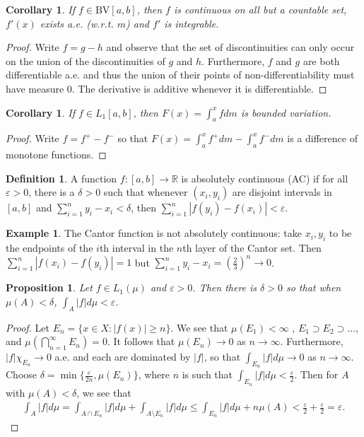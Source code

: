\documentclass[11pt]{amsart}
\newtheorem{proposition}[theorem]{Proposition}
\newtheorem{corollary}[theorem]{Corollary}
\theoremstyle{definition}
\newtheorem{definition}[theorem]{Definition}
\newtheorem{example}[theorem]{Example}
\numberwithin{equation}{section}
\begin{document}
\begin{corollary}
    If $f\in \mathrm{BV}[a,b]$, then $f$ is continuous on all but a countable set, $f'(x)$ exists a.e. (w.r.t. $m$) and $f'$ is integrable.
\end{corollary}
\begin{proof}
    Write $f=g-h$ and observe that the set of discontinuities can only occur on the union of the discontinuities of $g$ and $h$. Furthermore, $f$ and $g$ are both differentiable a.e. and thus the union of their points of non-differentiability must have measure 0. The derivative is additive whenever it is differentiable.
\end{proof}
\begin{corollary}
    If $f\in L_1[a,b]$, then $F(x)=\int_a^xfdm$ is bounded variation.
\end{corollary}
\begin{proof}
    Write $f=f^+-f^-$ so that $F(x)=\int_a^xf^+dm-\int_a^xf^-dm$ is a difference of monotone functions.
\end{proof}
\begin{definition}
    A function $f:[a,b]\to\mathbb R$ is absolutely continuous (AC) if for all $\varepsilon>0$, there is a $\delta>0$ such that whenever $(x_i,y_i)$ are disjoint intervals in $[a,b]$ and $\sum_{i=1}^ny_i-x_i<\delta$, then $\sum_{i=1}^n|f(y_i)-f(x_i)|<\varepsilon$.
\end{definition}
\begin{example}
    The Cantor function is not absolutely continuous: take $x_i,y_i$ to be the endpoints of the $i$th interval in the $n$th layer of the Cantor set. Then $\sum_{i=1}^n|f(x_i)-f(y_i)|=1$ but $\sum_{i=1}^ny_i-x_i=(\frac{2}{3})^n\to 0$.
\end{example}
\begin{proposition}
    Let $f\in L_1(\mu)$ and $\varepsilon>0$. Then there is $\delta>0$ so that when $\mu(A)<\delta$, $\int_A|f|d\mu<\varepsilon$.
\end{proposition}
\begin{proof}
    Let $E_n=\{x\in X:|f(x)|\ge n\}$. We see that $\mu(E_1)<\infty$ , $E_1\supset E_2\supset\ldots$, and $\mu(\bigcap_{n=1}^\infty E_n)=0$. It follows that $\mu(E_n)\to 0$ as $n\to\infty$. Furthermore, $|f|\chi_{E_n}\to 0$ a.e. and each are dominated by $|f|$, so that $\int_{E_n}|f|d\mu\to 0$ as $n\to\infty$. Choose $\delta=\min\{\frac{\varepsilon}{2n},\mu(E_n)\}$, where $n$ is such that $\int_{E_n}|f|d\mu<\frac{\varepsilon}{2}$. Then for $A$ with $\mu(A)<\delta$, we see that
    \begin{align*}
        \int_A|f|d\mu=\int_{A\cap E_n}|f|d\mu+\int_{A\setminus E_n}|f|d\mu\le \int_{ E_n}|f|d\mu+n\mu(A)<\frac{\varepsilon}{2}+\frac{\varepsilon}{2}=\varepsilon.
    \end{align*}
\end{proof}
\end{document}
